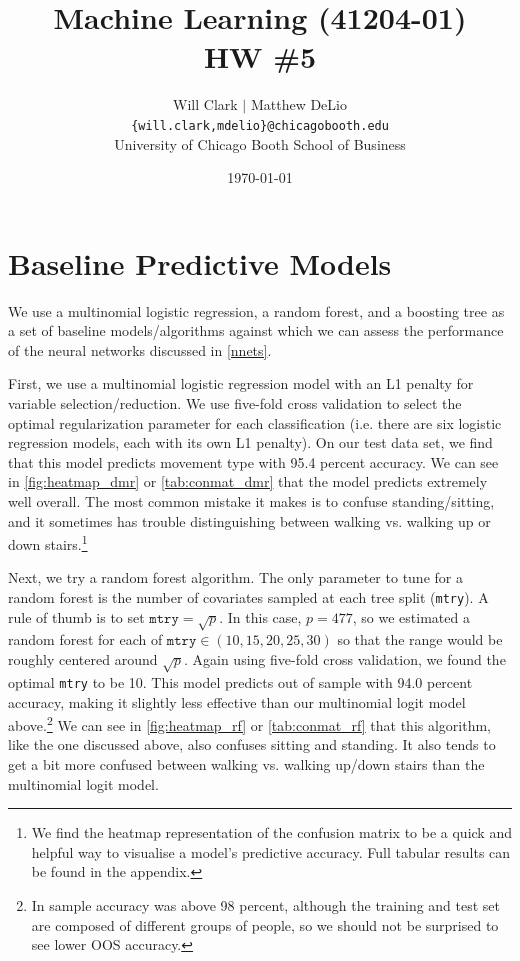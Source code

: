 



\title{Machine Learning (41204-01)\\HW \#5}
\author{Will Clark $\vert$ Matthew DeLio \\
\texttt{\{will.clark,mdelio\}@chicagobooth.edu} \\
University of Chicago Booth School of Business}
\date{\today}
\maketitle

\section{Baseline Predictive Models} \label{baseline}

We use a multinomial logistic regression, a random forest, and a boosting tree as a set of baseline models/algorithms against which we can assess the performance of the neural networks discussed in \cref{nnets}. 

First, we use a multinomial logistic regression model with an L1 penalty for variable selection/reduction. We use five-fold cross validation to select the optimal regularization parameter for each classification (i.e. there are six logistic regression models, each with its own L1 penalty). On our test data set, we find that this model predicts movement type with 95.4 percent accuracy. We can see in \cref{fig:heatmap_dmr} or \cref{tab:conmat_dmr} that the model predicts extremely well overall. The most common mistake it makes is to confuse standing/sitting, and it sometimes has trouble distinguishing between walking vs. walking up or down stairs.\footnote{We find the heatmap representation of the confusion matrix to be a quick and helpful way to visualise a model's predictive accuracy. Full tabular results can be found in the appendix.}

Next, we try a random forest algorithm. The only parameter to tune for a random forest is the number of covariates sampled at each tree split (\texttt{mtry}). A rule of thumb is to set $\texttt{mtry}=\sqrt{p}$. In this case, $p=477$, so we estimated a random forest for each of $\texttt{mtry}\in(10, 15, 20, 25, 30)$ so that the range would be roughly centered around $\sqrt{p}$. Again using five-fold cross validation, we found the optimal \texttt{mtry} to be 10. This model predicts out of sample with 94.0 percent accuracy, making it slightly less effective than our multinomial logit model above.\footnote{In sample accuracy was above 98 percent, although the training and test set are composed of different groups of people, so we should not be surprised to see lower OOS accuracy.} We can see in \cref{fig:heatmap_rf} or \cref{tab:conmat_rf} that this algorithm, like the one discussed above, also confuses sitting and standing. It also tends to get a bit more confused between walking vs. walking up/down stairs than the multinomial logit model.

